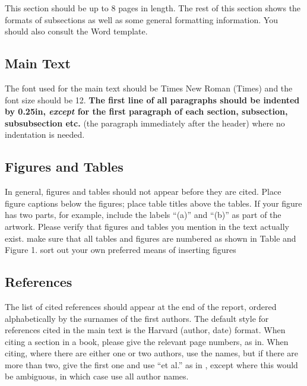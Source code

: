 \documentclass[12pt,a4paper]{article}
\begin{document}
This section should be up to 8 pages in length.
The rest of this section shows the formats of subsections as well as some general formatting information.  You should also consult the Word template.

\subsection{Main Text}

The font used for the main text should be Times New Roman (Times) and the font size should be 12.  \textbf{The first line of all paragraphs should be indented by 0.25in, \emph{except} for the first paragraph of each section, subsection, subsubsection etc.} (the paragraph immediately after the header) where no indentation is needed.

\subsection{Figures and Tables}
In general, figures and tables should not appear before they are cited.  Place figure captions below the figures; place table titles above the tables.  If your figure has two parts, for example, include the labels ``(a)'' and ``(b)'' as part of the artwork.  Please verify that figures and tables you mention in the text actually exist.  make sure that all tables and figures are numbered as shown in Table  and Figure 1.
sort out your own preferred means of inserting figures


\subsection{References}

The list of cited references should appear at the end of the report, ordered alphabetically by the surnames of the first authors.  The default style for references cited in the main text is the  Harvard (author, date) format.  When citing a section in a book, please give the relevant page numbers, as in.  When citing, where there are either one or two authors, use the names, but if there are more than two, give the first one and use ``et al.'' as in  , except where this would be ambiguous, in which case use all author names.
\end{document}
